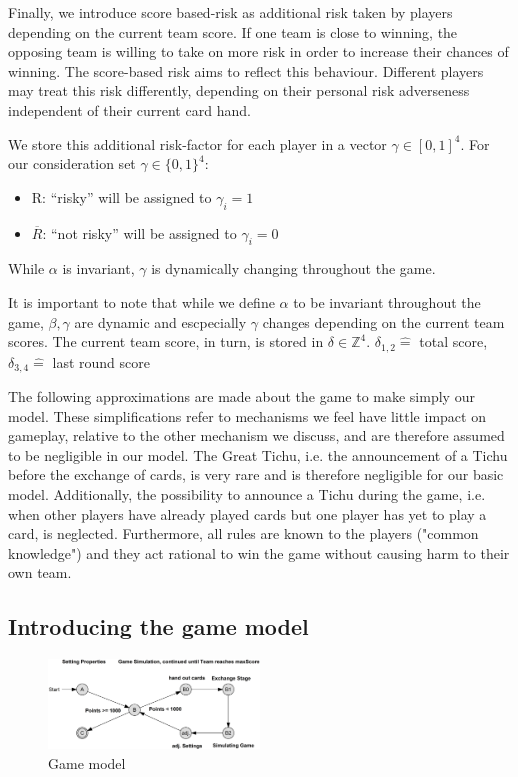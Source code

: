 Finally, we introduce score based-risk as additional risk taken by players depending on the current team score. If one team is close to winning, the opposing team is willing to take on more risk in order to increase their chances of winning. The score-based risk aims to reflect this behaviour. Different players may treat this risk differently, depending on their personal risk adverseness independent of their current card hand.

 We store this additional risk-factor for each player in a vector $\gamma \in [0,1]^4$. For our consideration set  $\gamma \in \{0,1\}^4$: \\
\begin{itemize}
\item R: “risky” will be assigned to $\gamma_i = 1$
\item $\overline{R}$: “not risky” will be assigned to $\gamma_i = 0$ \\
\end{itemize}
While $\alpha$ is invariant, $\gamma$ is dynamically changing throughout the game. 

It is important to note that while we define $\alpha$ to be invariant throughout the game, $\beta,\gamma$ are dynamic and escpecially $\gamma$ changes depending on the current team scores. The current team score, in turn, is stored in $\delta \in \mathbb{Z}^4$. 
$\delta_{1,2} \widehat{=}$ total score, $\delta_{3,4} \widehat{=}$ last round score

The following approximations are made about the game to make simply our model. These simplifications refer to mechanisms we feel have little impact on gameplay, relative to the other mechanism we discuss, and are therefore assumed to be negligible in our model. The Great Tichu, i.e. the announcement of a Tichu before the exchange of cards, is very rare and is therefore negligible for our basic model. Additionally, the possibility to announce a Tichu during the game, i.e. when other players have already played cards but one player has yet to play a card, is neglected. Furthermore, all rules are known to the players ("common knowledge") and they act rational to win the game without causing harm to their own team.

\subsection{Introducing the game model}

\begin{figure}[h]
    \centering
    \includegraphics[width=0.5\textwidth]{Bilder/graph}
    \caption{Game model}
    \label{fig:1}
\end{figure}

